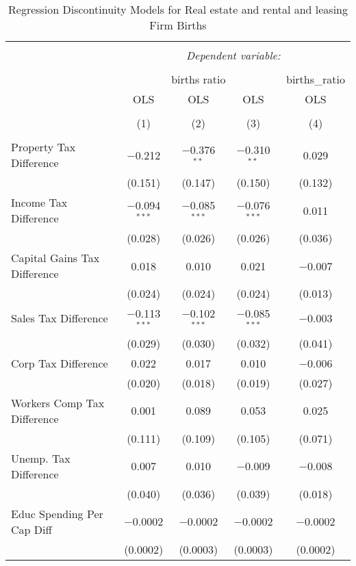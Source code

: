 
\begin{table}[!htbp] \centering 
  \caption{Regression Discontinuity Models for  Real estate and rental and leasing Firm Births} 
  \label{53rd} 
\begin{tabular}{@{\extracolsep{5pt}}lcccc} 
\\[-1.8ex]\hline 
\hline \\[-1.8ex] 
 & \multicolumn{4}{c}{\textit{Dependent variable:}} \\ 
\cline{2-5} 
\\[-1.8ex] & \multicolumn{3}{c}{births ratio} & births\_ratio \\ 
 & OLS & OLS & OLS & OLS \\ 
\\[-1.8ex] & (1) & (2) & (3) & (4)\\ 
\hline \\[-1.8ex] 
 Property Tax Difference & $-$0.212 & $-$0.376$^{**}$ & $-$0.310$^{**}$ & 0.029 \\ 
  & (0.151) & (0.147) & (0.150) & (0.132) \\ 
  Income Tax Difference & $-$0.094$^{***}$ & $-$0.085$^{***}$ & $-$0.076$^{***}$ & 0.011 \\ 
  & (0.028) & (0.026) & (0.026) & (0.036) \\ 
  Capital Gains Tax Difference & 0.018 & 0.010 & 0.021 & $-$0.007 \\ 
  & (0.024) & (0.024) & (0.024) & (0.013) \\ 
  Sales Tax Difference & $-$0.113$^{***}$ & $-$0.102$^{***}$ & $-$0.085$^{***}$ & $-$0.003 \\ 
  & (0.029) & (0.030) & (0.032) & (0.041) \\ 
  Corp Tax Difference & 0.022 & 0.017 & 0.010 & $-$0.006 \\ 
  & (0.020) & (0.018) & (0.019) & (0.027) \\ 
  Workers Comp Tax Difference & 0.001 & 0.089 & 0.053 & 0.025 \\ 
  & (0.111) & (0.109) & (0.105) & (0.071) \\ 
  Unemp. Tax Difference & 0.007 & 0.010 & $-$0.009 & $-$0.008 \\ 
  & (0.040) & (0.036) & (0.039) & (0.018) \\ 
  Educ Spending Per Cap Diff & $-$0.0002 & $-$0.0002 & $-$0.0002 & $-$0.0002 \\ 
  & (0.0002) & (0.0003) & (0.0003) & (0.0002) \\ 

\end{tabular}
\end{table}
